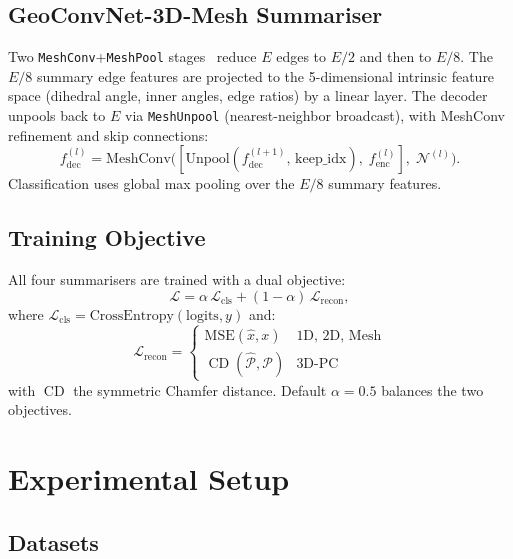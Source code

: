 \documentclass[10pt,conference]{IEEEtran}
\DeclareMathOperator{\CD}{CD}
\begin{document}
\subsection{GeoConvNet-3D-Mesh Summariser}

Two \texttt{MeshConv}+\texttt{MeshPool} stages~\cite{hanocka2019meshcnn}
reduce $E$ edges to $E/2$ and then to $E/8$.  The $E/8$ summary edge
features are projected to the 5-dimensional intrinsic feature space
(dihedral angle, inner angles, edge ratios) by a linear layer.  The
decoder unpools back to $E$ via \texttt{MeshUnpool} (nearest-neighbor
broadcast), with MeshConv refinement and skip connections:
\begin{equation}
  f^{(l)}_{\mathrm{dec}} = \mathrm{MeshConv}\!\bigl(
    [\mathrm{Unpool}(f^{(l+1)}_{\mathrm{dec}},\,\mathrm{keep\_idx}),\;
      f^{(l)}_{\mathrm{enc}}],\;\mathcal{N}^{(l)}\bigr).
\end{equation}
Classification uses global max pooling over the $E/8$ summary features.

\subsection{Training Objective}
\label{sec:training}

All four summarisers are trained with a dual objective:
\begin{equation}
  \mathcal{L} = \alpha\,\mathcal{L}_{\mathrm{cls}} +
                (1-\alpha)\,\mathcal{L}_{\mathrm{recon}},
  \label{eq:loss}
\end{equation}
where $\mathcal{L}_{\mathrm{cls}} =
\mathrm{CrossEntropy}(\mathrm{logits}, y)$ and:
\begin{equation}
  \mathcal{L}_{\mathrm{recon}} =
  \begin{cases}
    \mathrm{MSE}(\hat{x}, x) & \text{1D, 2D, Mesh} \\
    \CD(\hat{\mathcal{P}}, \mathcal{P}) & \text{3D-PC}
  \end{cases}
\end{equation}
with $\CD$ the symmetric Chamfer distance.  Default $\alpha = 0.5$
balances the two objectives.

\section{Experimental Setup}
\label{sec:experiments}

\subsection{Datasets}
\end{document}
